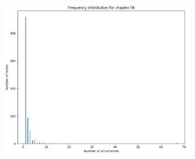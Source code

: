 \documentclass{article}
\begin{document}
\begin{flushleft}
\begin{figure}[H]
\begin{minipage}{0.45\linewidth}
			\includegraphics[width=0.75\textwidth]{./images/10-chapter_wise-frequency.png}
		\end{minipage}
	\end{figure}
\end{flushleft}
\end{document}
